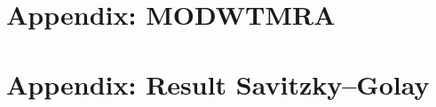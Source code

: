 \documentclass[a4paper,12pt, oneside]{book}
\begin{document}
\newpage
% 
{
  \pagestyle{plain}
  \tableofcontents
  \cleardoublepage
}

%






\listoftables
\listoffigures



\appendix
\chapter{Appendix: MODWTMRA}

\appendix

\chapter{Appendix: Result Savitzky–Golay}































\fancyhead[LO,RE]{\slshape \leftmark}
\fancyhead[LE,RO]{}
%
%
\end{document}
